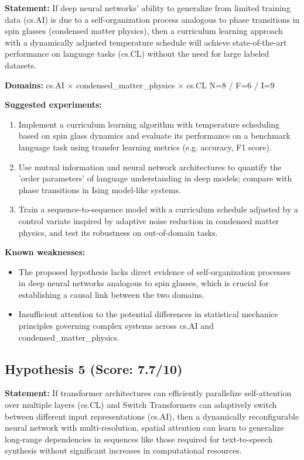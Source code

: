\documentclass[12pt,a4paper]{article}
\begin{document}
\textbf{Statement:} If deep neural networks' ability to generalize from limited training data (cs.AI) is due to a self-organization process analogous to phase transitions in spin glasses (condensed matter physics), then a curriculum learning approach with a dynamically adjusted temperature schedule will achieve state-of-the-art performance on language tasks (cs.CL) without the need for large labeled datasets.

\noindent\textbf{Domains:} cs.AI $\times$ condensed\_matter\_physics $\times$ cs.CL
\hspace{1em} N=8 / F=6 / I=9

\textbf{Suggested experiments:}
\begin{enumerate}
  \item Implement a curriculum learning algorithm with temperature scheduling based on spin glass dynamics and evaluate its performance on a benchmark language task using transfer learning metrics (e.g. accuracy, F1 score).
  \item Use mutual information and neural network architectures to quantify the 'order parameters' of language understanding in deep models; compare with phase transitions in Ising model-like systems.
  \item Train a sequence-to-sequence model with a curriculum schedule adjusted by a control variate inspired by adaptive noise reduction in condensed matter physics, and test its robustness on out-of-domain tasks.
\end{enumerate}

\textbf{Known weaknesses:}
\begin{itemize}
  \item The proposed hypothesis lacks direct evidence of self-organization processes in deep neural networks analogous to spin glasses, which is crucial for establishing a causal link between the two domains.
  \item Insufficient attention to the potential differences in statistical mechanics principles governing complex systems across cs.AI and condensed\_matter\_physics.
\end{itemize}
\subsection*{Hypothesis 5 (Score: 7.7/10)}

\textbf{Statement:} If transformer architectures can efficiently parallelize self-attention over multiple layers (cs.CL) and Switch Transformers can adaptively switch between different input representations (cs.AI), then a dynamically reconfigurable neural network with multi-resolution, spatial attention can learn to generalize long-range dependencies in sequences like those required for text-to-speech synthesis without significant increases in computational resources.
\end{document}
